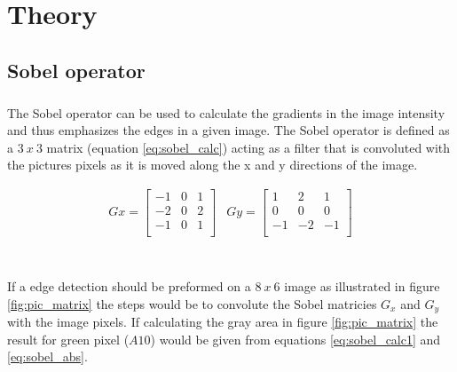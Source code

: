 \chapter{Theory}
\label{chap:theory}

\section{Sobel operator}
\label{sec:Sobel}
\paragraph*{}
The Sobel operator can be used to calculate the gradients in the image intensity and thus emphasizes the edges in a given image. The Sobel operator is defined as a $3~x~3$ matrix (equation \ref{eq:sobel_calc}) acting as a filter that is convoluted with the pictures pixels as it is moved along the x and y directions of the image.

\begin{equation}
\begin{array}{cc}
Gx = \left[ 
\begin{array}{ccc}
	-1 & 0 & 1\\
    -2 & 0 & 2\\
    -1 & 0 & 1\\
\end{array} \right] &
Gy = \left[ 
\begin{array}{ccc}
	1 & 2 & 1\\
    0 & 0 & 0\\
    -1 & -2 & -1\\
\end{array}
\right]
\end{array}
\label{eq:sobel_calc}
\end{equation}\\

\paragraph*{}
If a edge detection should be preformed on a $8~x~6$ image as illustrated in figure \ref{fig:pic_matrix} the steps would be to convolute the Sobel matricies $G_x$ and $G_y$ with the image pixels. If calculating the gray area in figure \ref{fig:pic_matrix} the result for green pixel ($A10$) would be given from equations \ref{eq:sobel_calc1} and \ref{eq:sobel_abs}.  

